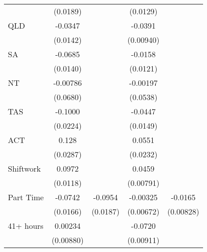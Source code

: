 {\begin{tabular}{l*{4}{c}}
                    &    (0.0189)         &                     &    (0.0129)         &                     \\
[1em]
QLD                 &     -0.0347\sym{*}  &                     &     -0.0391\sym{***}&                     \\
                    &    (0.0142)         &                     &   (0.00940)         &                     \\
[1em]
SA                  &     -0.0685\sym{***}&                     &     -0.0158         &                     \\
                    &    (0.0140)         &                     &    (0.0121)         &                     \\
[1em]
NT                  &    -0.00786         &                     &    -0.00197         &                     \\
                    &    (0.0680)         &                     &    (0.0538)         &                     \\
[1em]
TAS                 &     -0.1000\sym{***}&                     &     -0.0447\sym{**} &                     \\
                    &    (0.0224)         &                     &    (0.0149)         &                     \\
[1em]
ACT                 &       0.128\sym{***}&                     &      0.0551\sym{*}  &                     \\
                    &    (0.0287)         &                     &    (0.0232)         &                     \\
[1em]
Shiftwork           &      0.0972\sym{***}&                     &      0.0459\sym{***}&                     \\
                    &    (0.0118)         &                     &   (0.00791)         &                     \\
[1em]
Part Time           &     -0.0742\sym{***}&     -0.0954\sym{***}&    -0.00325         &     -0.0165\sym{*}  \\
                    &    (0.0166)         &    (0.0187)         &   (0.00672)         &   (0.00828)         \\
[1em]
41+ hours           &     0.00234         &                     &     -0.0720\sym{***}&                     \\
                    &   (0.00880)         &                     &   (0.00911)         &                     \\

\end{tabular}}
